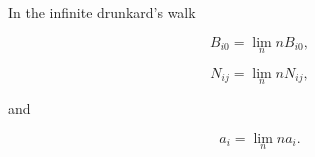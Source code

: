 In the infinite drunkard's walk

$$B_{i0} = \lim_n nB_{i0},$$

$$N_{ij} = \lim_n nN_{ij},$$

and

$$a_i = \lim_n na_i.$$
